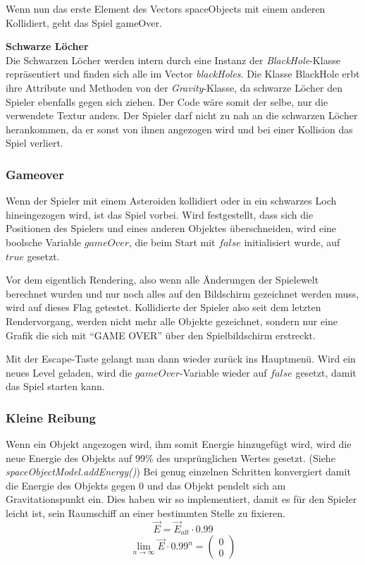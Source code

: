 \documentclass[12pt,a4paper]{scrartcl}
\newcommand{\q}[1]{``#1''}
\begin{document}
Wenn nun das erste Element des Vectors spaceObjects mit einem anderen Kollidiert, geht das Spiel gameOver.

\textbf{Schwarze Löcher}		\\
Die Schwarzen Löcher werden intern durch eine Instanz der \textit{BlackHole}-Klasse repräsentiert und finden sich alle im Vector \textit{blackHoles}.
Die Klasse BlackHole erbt ihre Attribute und Methoden von der \textit{Gravity}-Klasse, da schwarze Löcher den Spieler ebenfalls gegen sich ziehen.
Der Code wäre somit der selbe, nur die verwendete Textur anders. Der Spieler darf nicht zu nah an die schwarzen Löcher herankommen, da er sonst
von ihnen angezogen wird und bei einer Kollision das Spiel verliert. 


\subsubsection{Gameover}
Wenn der Spieler mit einem Asteroiden kollidiert oder in ein schwarzes Loch
hineingezogen wird, ist das Spiel vorbei. Wird festgestellt, dass sich die 
Positionen des Spielers und eines anderen Objektes überschneiden, wird eine boolsche
Variable $gameOver$, die beim Start mit $false$ initialisiert wurde, auf $true$ gesetzt.

Vor dem eigentlich Rendering, also wenn alle Änderungen der Spielewelt berechnet wurden
und nur noch alles auf den Bildschirm gezeichnet werden muss, wird auf dieses Flag getestet.
Kollidierte der Spieler also seit dem letzten Rendervorgang, werden nicht mehr alle Objekte
gezeichnet, sondern nur eine Grafik die sich mit \q{GAME OVER} über den Spielbildschirm erstreckt.

Mit der Escape-Taste gelangt man dann wieder zurück ins Hauptmenü. Wird ein neues Level geladen,
wird die $gameOver$-Variable wieder auf $false$ gesetzt, damit das Spiel starten kann.


\subsubsection{Kleine Reibung}
Wenn ein Objekt angezogen wird, ihm somit Energie hinzugefügt wird, wird die neue Energie des Objekts auf 99\%
des ursprünglichen Wertes gesetzt. (Siehe \textit{spaceObjectModel.addEnergy()}) Bei genug einzelnen Schritten konvergiert damit die Energie des Objekts gegen 0 und
das Objekt pendelt sich am Gravitationspunkt ein. Dies haben wir so implementiert, damit es für den Spieler leicht ist,
sein Raumschiff an einer bestimmten Stelle zu fixieren.
\[ \vec{E} = \vec{E}_{alt} \cdot 0.99 \]
\[ \lim_{n\rightarrow \infty} \vec{E} \cdot 0.99^n = \begin{pmatrix}0\\0\end{pmatrix} \] 
\end{document}
